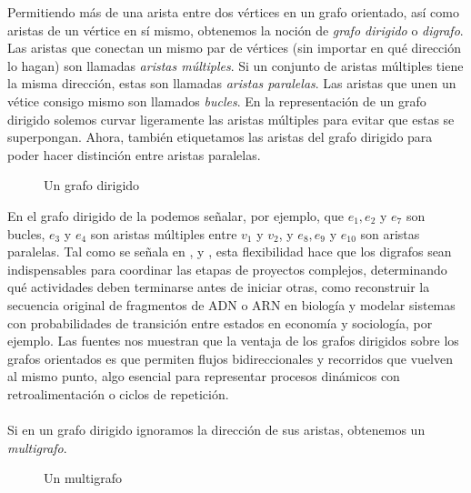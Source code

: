 Permitiendo más de una arista entre dos vértices en un grafo orientado, así como aristas de un vértice en sí mismo, obtenemos la noción de \textit{grafo dirigido} o \textit{digrafo}. Las aristas que conectan un mismo par de vértices (sin importar en qué dirección lo hagan) son llamadas \textit{aristas múltiples}. Si un conjunto de aristas múltiples tiene la misma dirección, estas son llamadas \textit{aristas paralelas}. Las aristas que unen un vétice consigo mismo son llamados \textit{bucles}. En la representación de un grafo dirigido solemos curvar ligeramente las aristas múltiples para evitar que estas se superpongan. Ahora, también etiquetamos las aristas del grafo dirigido para poder hacer distinción entre aristas paralelas.
\begin{figure}[H]
  \centering
    \resizebox{0.5\textwidth}{!}{} 
  \caption{Un grafo dirigido}
  \label{fig:digrafo}
\end{figure}
En el grafo dirigido de la  podemos señalar, por ejemplo, que $e_1, e_2$ y $e_7$ son bucles, $e_3$ y $e_4$ son aristas múltiples entre $v_1$ y $v_2$, y $e_8,e_9$ y $e_{10}$ son aristas paralelas. Tal como se señala en \cite{Foulds1991}, \cite{Gross2006} y \cite{Roberts1978}, esta flexibilidad hace que los digrafos sean indispensables para coordinar las etapas de proyectos complejos, determinando qué actividades deben terminarse antes de iniciar otras, como reconstruir la secuencia original de fragmentos de ADN o ARN en biología y modelar sistemas con probabilidades de transición entre estados en economía y sociología, por ejemplo. Las fuentes nos muestran que la ventaja de los grafos dirigidos sobre los grafos orientados es que permiten flujos bidireccionales y recorridos que vuelven al mismo punto, algo esencial para representar procesos dinámicos con retroalimentación o ciclos de repetición.\\\\
Si en un grafo dirigido ignoramos la dirección de sus aristas, obtenemos un \textit{multigrafo}.
\begin{figure}[H]
  \centering
  \resizebox{0.45\textwidth}{!}{} 
  \caption{Un multigrafo}
  \label{fig:multigrafo}
\end{figure}
